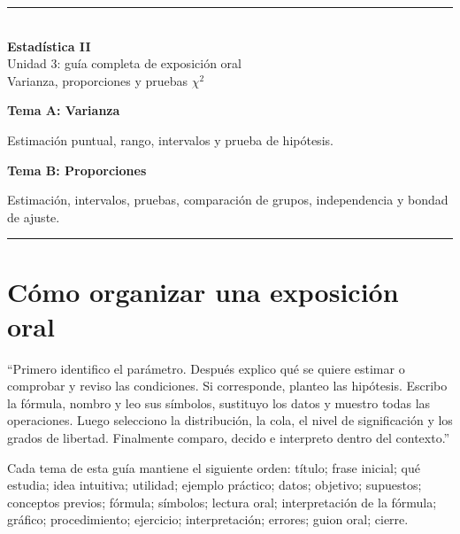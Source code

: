 \documentclass[11pt,a4paper]{article}
\begin{document}
\begin{titlepage}\thispagestyle{empty}\centering\vspace*{2cm}
{\color{azul}\rule{\textwidth}{1.2pt}}\\[1.2cm]
{\fontsize{28}{33}\selectfont\bfseries\color{azul} Estadística II}\\[5mm]
{\LARGE Unidad 3: guía completa de exposición oral}\\[4mm]
{\large Varianza, proporciones y pruebas $\chi^2$}\\[1.1cm]
\begin{tcolorbox}[width=.82\textwidth,colback=grisclaro,colframe=azul]
\RaggedRight\textbf{Tema A: Varianza}\par
Estimación puntual, rango, intervalos y prueba de hipótesis.\par\medskip
\textbf{Tema B: Proporciones}\par
Estimación, intervalos, pruebas, comparación de grupos, independencia y bondad de ajuste.
\end{tcolorbox}\vfill{\color{azul}\rule{\textwidth}{1.2pt}}
\end{titlepage}
\tableofcontents\clearpage{}

\section{Cómo organizar una exposición oral}
\begin{oral}
``Primero identifico el parámetro. Después explico qué se quiere estimar o comprobar y reviso las condiciones. Si corresponde, planteo las hipótesis. Escribo la fórmula, nombro y leo sus símbolos, sustituyo los datos y muestro todas las operaciones. Luego selecciono la distribución, la cola, el nivel de significación y los grados de libertad. Finalmente comparo, decido e interpreto dentro del contexto.''
\end{oral}

Cada tema de esta guía mantiene el siguiente orden: título; frase inicial; qué estudia; idea intuitiva; utilidad; ejemplo práctico; datos; objetivo; supuestos; conceptos previos; fórmula; símbolos; lectura oral; interpretación de la fórmula; gráfico; procedimiento; ejercicio; interpretación; errores; guion oral; cierre.
\end{document}
